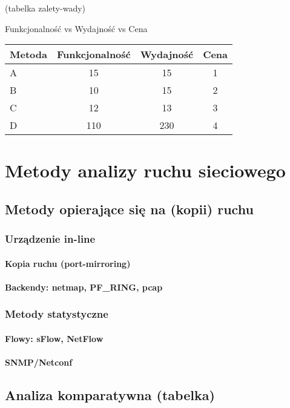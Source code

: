  (tabelka zalety-wady)
 
	Funkcjonalność vs Wydajność vs Cena
	
\begin{center}
  \begin{tabular}{ | l || c | c | c |}
    \hline
    Metoda & Funkcjonalność & Wydajność & Cena \\
    \hline \hline
    A & 15 & 15 & 1\\
    \hline
    B & 10 & 15 & 2 \\
    \hline
    C & 12 & 13 & 3\\
    \hline
    D & 110 & 230 & 4\\
    \hline
  \end{tabular}
\end{center}

\section{Metody analizy ruchu sieciowego}
\subsection{Metody opierające się na (kopii) ruchu}
\subsubsection{Urządzenie in-line}
\paragraph{Kopia ruchu (port-mirroring)}
\paragraph{Backendy: netmap, PF\_RING, pcap}
\subsubsection{Metody statystyczne}
\paragraph{Flowy: sFlow, NetFlow}
\paragraph{SNMP/Netconf}
\subsection{Analiza komparatywna (tabelka)}

